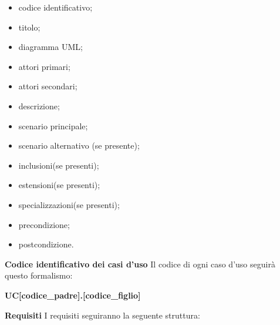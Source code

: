 				\begin{itemize}
					\item codice identificativo;
					\item titolo;
					\item diagramma UML\glo;
					\item attori primari;
					\item attori secondari;
					\item descrizione;
					\item scenario principale;
					\item scenario alternativo (se presente);
					\item inclusioni(se presenti);
					\item estensioni(se presenti);
					\item specializzazioni(se presenti);
					\item precondizione;
					\item postcondizione. 
				\end{itemize}
				\newline \newline
				\textbf{Codice identificativo dei casi d'uso} \newline \newline
			Il codice di ogni caso d'uso seguirà questo formalismo: \newline \newline
			\centerline{\textbf{UC[codice\_padre].[codice\_figlio]}} \newline \newline
			\textbf{Requisiti} \newline \newline
			I requisiti seguiranno la seguente struttura:
